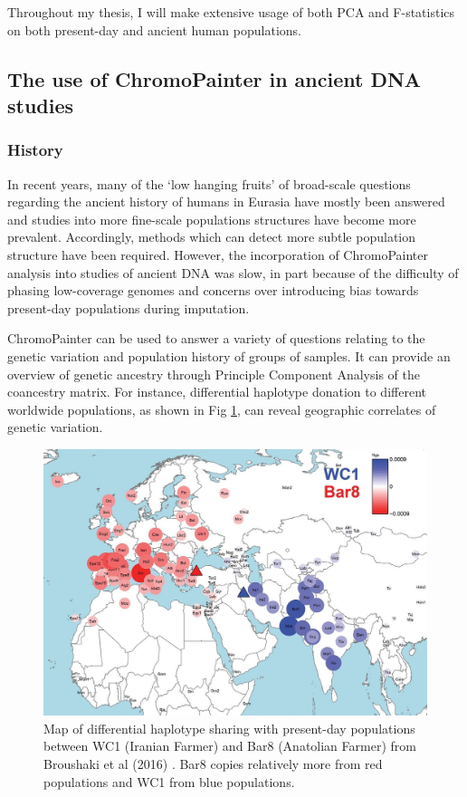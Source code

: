 Throughout my thesis, I will make extensive usage of both PCA and F-statistics on both present-day and ancient human populations.


\subsection{The use of ChromoPainter in ancient DNA studies}

\subsubsection{History}

In recent years, many of the `low hanging fruits' of broad-scale questions regarding the ancient history of humans in Eurasia have mostly been answered and studies into more fine-scale populations structures have become more prevalent. Accordingly, methods which can detect more subtle population structure have been required. However, the incorporation of ChromoPainter analysis into studies of ancient DNA was slow, in part because of the difficulty of phasing low-coverage genomes and concerns over introducing bias towards present-day populations during imputation. 

ChromoPainter can be used to answer a variety of questions relating to the genetic variation and population history of groups of samples. It can provide an overview of genetic ancestry through Principle Component Analysis of the coancestry matrix. For instance, differential haplotype donation to different worldwide populations, as shown in Fig \ref{fig:broushaki_haplotype_sharing}, can reveal geographic correlates of genetic variation. 

\begin{figure}[htp]
    \centering
    \includegraphics[width=1.0\textwidth]{../images/introduction/broushaki_haplotype_sharing.jpg}
    \caption{Map of differential haplotype sharing with present-day populations between WC1 (Iranian Farmer) and Bar8 (Anatolian Farmer) from Broushaki et al (2016) \cite{Broushaki2016a}. Bar8 copies relatively more from red populations and WC1 from blue populations.}
    \label{fig:broushaki_haplotype_sharing}
\end{figure}



